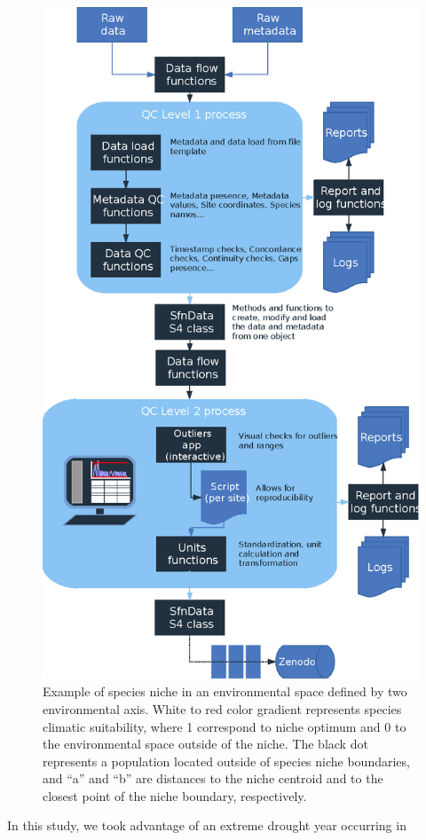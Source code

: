 \documentclass[11pt,twoside]{reedthesis}
\begin{document}
\setlength{\abovecaptionskip}{10pt}
\begin{figure}[hbt!]

{\centering \includegraphics[width=0.8\linewidth]{figure/CH3/figure1} 

}

\caption[Example of species niche in the environmental space]{Example of species niche in an environmental space defined by two environmental axis. White to red color gradient represents species climatic suitability, where 1 correspond to niche optimum and 0 to the environmental space outside of the niche. The black dot represents a population located outside of species niche boundaries, and “a” and “b” are distances to the niche centroid and to the closest point of the niche boundary, respectively.}\label{fig:Ch3plot1}
\end{figure}
In this study, we took advantage of an extreme drought year occurring in
\end{document}
